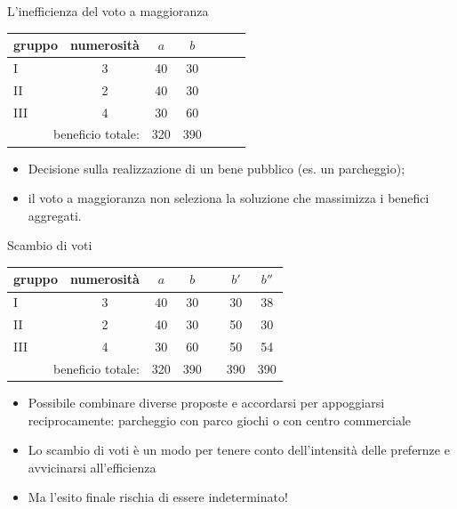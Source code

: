 \documentclass[aspectratio=64,12pt]{beamer}
\begin{document}
\begin{frame}{L'inefficienza del voto a maggioranza}
\begin{center}
\begin{tabular}{lcccccc}\toprule
    gruppo& numerosità &$a$ &$b$\\
    \midrule
    I      & 3 & 40 & 30\\
    II     & 2 & 40 & 30\\
    III    & 4 & 30 & 60\\\midrule
    \multicolumn{2}{r}{beneficio totale:} & 320 & 390\\
    \bottomrule
\end{tabular}
\end{center}

\begin{itemize}
\item Decisione sulla realizzazione di un bene pubblico (es. un parcheggio);
\item il voto a maggioranza non seleziona la soluzione che massimizza i benefici aggregati.
\end{itemize}
\end{frame}

\begin{frame}{Scambio di voti}
\begin{center}
\begin{tabular}{lcccccc}\toprule
    gruppo& numerosità &$a$ &$b$ &&$b'$ &$b''$\\
    \midrule
    I      & 3 & 40 & 30 && 30 & 38\\
    II     & 2 & 40 & 30 && 50 & 30\\
    III    & 4 & 30 & 60 && 50 & 54\\\midrule
    \multicolumn{2}{r}{beneficio totale:} & 320 & 390 &&390 & 390\\
    \bottomrule
\end{tabular}
\end{center}

\begin{itemize}
\item Possibile combinare diverse proposte e accordarsi per appoggiarsi reciprocamente: parcheggio con parco giochi o con centro commerciale
\item Lo scambio di voti è un modo per tenere conto dell'intensità delle prefernze e avvicinarsi all'efficienza
\item Ma l'esito finale rischia di essere indeterminato!
\end{itemize}
\end{frame}
\end{document}
